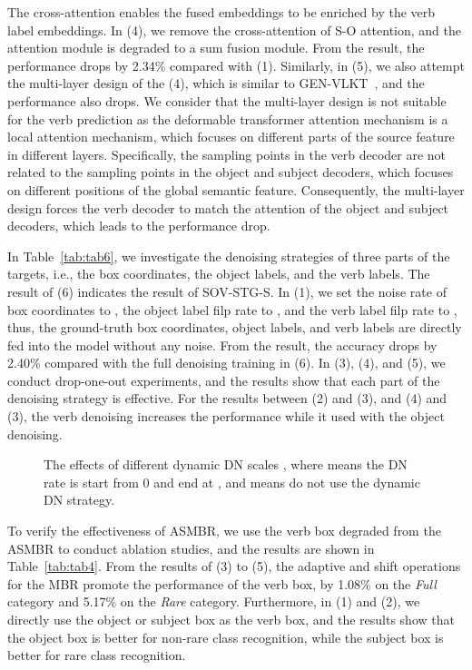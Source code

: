 \documentclass[10pt,twocolumn,letterpaper]{article}
\begin{document}
The cross-attention enables the fused embeddings to be enriched by the verb label embeddings.
In (4), we remove the cross-attention of S-O attention, and the attention module is degraded to a sum fusion module.
From the result, the performance drops by 2.34\% compared with (1).
Similarly, in (5), we also attempt the multi-layer design of the (4), which is similar to GEN-VLKT~\cite{liao2022gen}, and the performance also drops.
We consider that the multi-layer design is not suitable for the verb prediction as the deformable transformer attention mechanism is a local attention mechanism, which focuses on different parts of the source feature in different layers.
Specifically, the sampling points in the verb decoder are not related to the sampling points in the object and subject decoders, which focuses on different positions of the global semantic feature.
Consequently, the multi-layer design forces the verb decoder to match the attention of the object and subject decoders, which leads to the performance drop.

\quad In Table~\ref{tab:tab6}, we investigate the denoising strategies of three parts of the targets, i.e., the box coordinates, the object labels, and the verb labels.
The result of (6) indicates the result of SOV-STG-S.
In (1), we set the noise rate of box coordinates to , the object label filp rate to , and the verb label filp rate to , thus, the ground-truth box coordinates, object labels, and verb labels are directly fed into the model without any noise.
From the result, the accuracy drops by 2.40\% compared with the full denoising training in (6).
In (3), (4), and (5), we conduct drop-one-out experiments, and the results show that each part of the denoising strategy is effective.
For the results between (2) and (3), and (4) and (3), the verb denoising increases the performance while it used with the object denoising.

\begin{figure}[!t]
  \centering
  \caption{The effects of different dynamic DN scales , where  means the DN rate  is start from 0 and end at , and  means do not use the dynamic DN strategy.}
  \label{fig:dynamic_noise_scale}
\end{figure}

\quad To verify the effectiveness of ASMBR, we use the verb box degraded from the ASMBR to conduct ablation studies, and the results are shown in Table~\ref{tab:tab4}.
From the results of (3) to (5), the adaptive and shift operations for the MBR promote the performance of the verb box, by 1.08\% on the \textit{Full} category and 5.17\% on the \textit{Rare} category.
Furthermore, in (1) and (2), we directly use the object or subject box as the verb box, and the results show that the object box is better for non-rare class recognition, while the subject box is better for rare class recognition.
\end{document}
